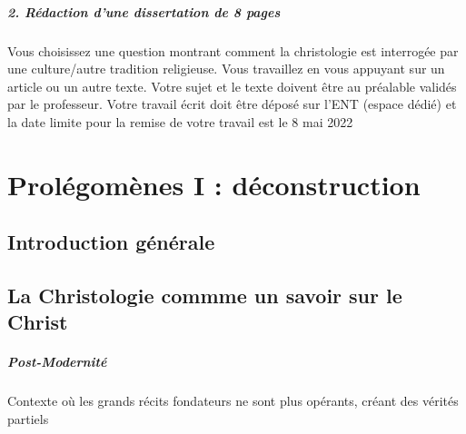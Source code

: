 \paragraph{2. Rédaction d’une dissertation de 8 pages}
Vous choisissez une question montrant comment la christologie est interrogée par une
culture/autre tradition religieuse. Vous travaillez en vous appuyant sur un article ou un autre
texte.
Votre sujet et le texte doivent être au préalable validés par le professeur.
Votre travail écrit doit être déposé sur l’ENT (espace dédié) et la date limite pour la
remise de votre travail est le 8 mai 2022
\chapter{Prolégomènes I : déconstruction}

\section{Introduction générale}

\section{La Christologie commme un savoir sur le Christ}
\paragraph{Post-Modernité}
\begin{Def}
Contexte où les grands récits fondateurs ne sont plus opérants, créant des vérités partiels
\end{Def}

